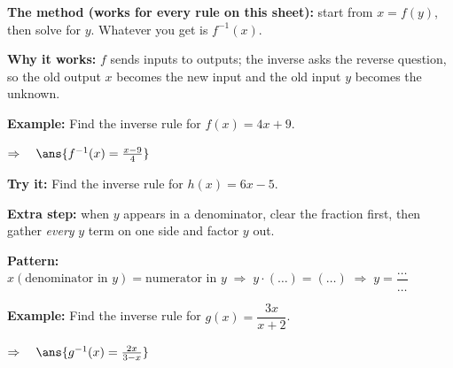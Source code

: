 \documentclass[12pt]{article}
\begin{document}


\begin{formulabox}
\textbf{The method (works for every rule on this sheet):} start from $x = f(y)$, then solve for $y$. Whatever you get is $f^{-1}(x)$.\par
\textbf{Why it works:} $f$ sends inputs to outputs; the inverse asks the reverse question, so the old output $x$ becomes the new input and the old input $y$ becomes the unknown.
\end{formulabox}

\begin{examplebox}
\textbf{Example:} \quad Find the inverse rule for $f(x) = 4x + 9$.

$\Rightarrow\quad \ans{f^{-1}(x) = \tfrac{x - 9}{4}}$
\end{examplebox}

\begin{tryitbox}
\textbf{Try it:} \quad Find the inverse rule for $h(x) = 6x - 5$.\\[2pt]
\end{tryitbox}


\begin{formulabox}
\textbf{Extra step:} when $y$ appears in a denominator, clear the fraction first, then gather \emph{every} $y$ term on one side and factor $y$ out.\par
\textbf{Pattern:} $x(\text{denominator in } y) = \text{numerator in } y \;\Rightarrow\; y \cdot (\ldots) = (\ldots) \;\Rightarrow\; y = \dfrac{\ldots}{\ldots}$
\end{formulabox}

\begin{examplebox}
\textbf{Example:} \quad Find the inverse rule for $g(x) = \dfrac{3x}{x + 2}$.

$\Rightarrow\quad \ans{g^{-1}(x) = \tfrac{2x}{3 - x}}$
\end{examplebox}
\end{document}
